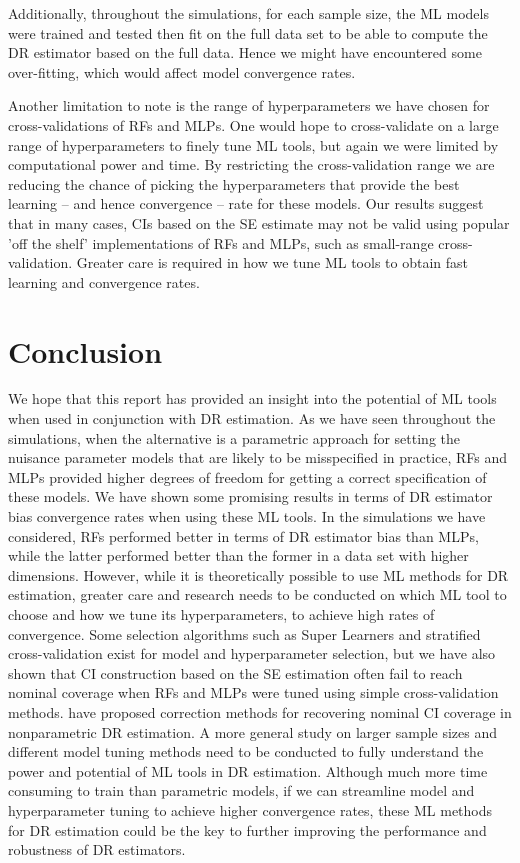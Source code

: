 \documentclass[12pt,twoside]{article}
\begin{document}
Additionally, throughout the simulations, for each sample size, the ML models were trained and tested then fit on the full data set to be able to compute the DR estimator based on the full data. Hence we might have encountered some over-fitting, which would affect model convergence rates.

Another limitation to note is the range of hyperparameters we have chosen for cross-validations of RFs and MLPs. One would hope to cross-validate on a large range of hyperparameters to finely tune ML tools, but again we were limited by computational power and time. By restricting the cross-validation range we are reducing the chance of picking the hyperparameters that provide the best learning -- and hence convergence -- rate for these models. Our results suggest that in many cases, CIs based on the \cite{lunceford_davidian} SE estimate may not be valid using popular 'off the shelf' implementations of RFs and MLPs, such as small-range cross-validation. Greater care is required in how we tune ML tools to obtain fast learning and convergence rates.

\section{Conclusion}

We hope that this report has provided an insight into the potential of ML tools when used in conjunction with DR estimation. As we have seen throughout the simulations, when the alternative is a parametric approach for setting the nuisance parameter models that are likely to be misspecified in practice, RFs and MLPs provided higher degrees of freedom for getting a correct specification of these models. We have shown some promising results in terms of DR estimator bias convergence rates when using these ML tools. In the simulations we have considered, RFs performed better in terms of DR estimator bias than MLPs, while the latter performed better than the former in a data set with higher dimensions. However, while it is theoretically possible to use ML methods for DR estimation, greater care and research needs to be conducted on which ML tool to choose and how we tune its hyperparameters, to achieve high rates of convergence. Some selection algorithms such as Super Learners and stratified cross-validation exist for model and hyperparameter selection, but we have also shown that CI construction based on the \cite{lunceford_davidian} SE estimation often fail to reach nominal coverage when RFs and MLPs were tuned using simple cross-validation methods. \cite{benkeser2017} have proposed correction methods for recovering nominal CI coverage in nonparametric DR estimation. A more general study on larger sample sizes and different model tuning methods need to be conducted to fully understand the power and potential of ML tools in DR estimation. Although much more time consuming to train than parametric models, if we can streamline model and hyperparameter tuning to achieve higher convergence rates, these ML methods for DR estimation could be the key to further improving the performance and robustness of DR estimators.
\end{document}
